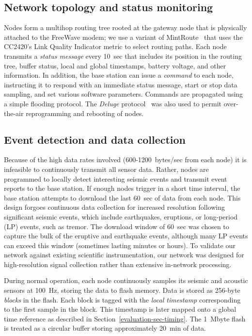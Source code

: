 \subsection{Network topology and status monitoring}

Nodes form a multihop routing tree rooted at the gateway node that is
physically attached to the FreeWave modem; we use a variant of
MintRoute~\cite{awoo-multihop} that uses the CC2420's Link Quality Indicator
metric to select routing paths. Each node transmits a {\em status message}
every 10~sec that includes its position in the routing tree, buffer status,
local and global timestamps, battery voltage, and other information. 
In addition, the base station can issue a {\em command} to each node,
instructing it to respond with an immediate status message, start or stop
data sampling, and set various software parameters.  Commands are propagated
using a simple flooding protocol.  The {\em Deluge} protocol~\cite{deluge}
was also used to permit over-the-air reprogramming and rebooting of nodes.

\subsection{Event detection and data collection}

Because of the high data rates involved (600-1200~bytes/sec from each node)
it is infeasible to continuously transmit all sensor data. Rather, nodes are
programmed to locally detect interesting seismic events and transmit event
reports to the base station. If enough nodes trigger in a short time
interval, the base station attempts to download the last 60~sec of data from
each node.  This design forgoes continuous data collection for increased
resolution following significant seismic events, which include earthquakes,
eruptions, or long-period (LP) events, such as tremor.  The download window
of 60~sec was chosen to capture the bulk of the eruptive and earthquake
events, although many LP events can exceed this window (sometimes lasting
minutes or hours).  To validate our network against existing scientific
instrumentation, our network was designed for high-resolution signal
collection rather than extensive in-network processing.

During normal operation, each node continuously samples its seismic and
acoustic sensors at 100~Hz, storing the data to flash memory. Data is stored
as 256-byte {\em blocks} in the flash.
Each block 
is tagged with the {\em local timestamp} corresponding to the first sample in
the block.  This timestamp is later mapped onto a global time reference as
described in Section~\ref{evaluation-sec-timing}. The 1~Mbyte flash is
treated as a circular buffer storing approximately 20~min of data. 

